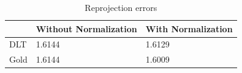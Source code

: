 \documentclass[paper=a4, fontsize=11pt]{scrartcl} %
\numberwithin{equation}{section} %
\numberwithin{figure}{section} %
\numberwithin{table}{section} %
\begin{document}
\begin{table}[]
\centering
\caption{Reprojection errors}
\label{tab:errors}
\begin{tabular}{|l|l|l|}
\hline
 & Without Normalization & With Normalization \\ \hline
DLT   & 1.6144                & 1.6129             \\ \hline
Gold  & 1.6144                & 1.6009             \\ \hline
\end{tabular}
\end{table}
\end{document}
